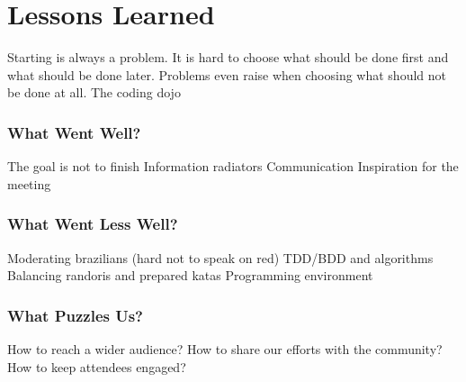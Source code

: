 \section{Lessons Learned}\label{sec:lessons_learned}

Starting is always a problem. It is hard to choose what should be done
first and what should be done later. Problems even raise when choosing
what should not be done at all. The coding dojo 

\subsubsection{What Went Well?}\label{ssub:well}
The goal is not to finish
Information radiators
Communication
Inspiration for the meeting

\subsubsection{What Went Less Well?}\label{ssub:less_well}
Moderating brazilians (hard not to speak on red)
TDD/BDD and algorithms
Balancing randoris and prepared katas
Programming environment

\subsubsection{What Puzzles Us?}\label{ssub:puzzles}
How to reach a wider audience?
How to share our efforts with the community?
How to keep attendees engaged?